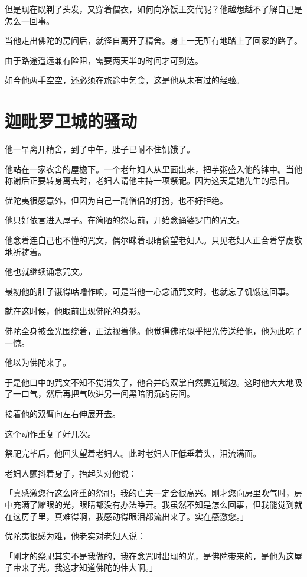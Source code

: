 \documentclass[twoside,openany]{book}
\begin{document}
但是现在既剃了头发，又穿着僧衣，如何向净饭王交代呢？他越想越不了解自己是怎么一回事。

当他走出佛陀的房间后，就径自离开了精舍。身上一无所有地踏上了回家的路子。

由于路途遥远兼有险阻，需要两天半的时间才可到达。

如今他两手空空，还必须在旅途中乞食，这是他从未有过的经验。

\section{迦毗罗卫城的骚动}\label{sec7.5}

他一早离开精舍，到了中午，肚子已耐不住饥饿了。

他站在一家农舍的屋檐下。一个老年妇人从里面出来，把芋粥盛入他的钵中。当他称谢后正要转身离去时，老妇人请他主持一项祭祀。因为这天是她先生的忌日。

优陀夷很感意外，但因为自己一副僧侣的打扮，也不好拒绝。

他只好依言进入屋子。在简陋的祭坛前，开始念诵婆罗门的咒文。

他念着连自己也不懂的咒文，偶尔眯着眼睛偷望老妇人。只见老妇人正合着掌虔敬地祈祷着。

他也就继续诵念咒文。

最初他的肚子饿得咕噜作响，可是当他一心念诵咒文时，也就忘了饥饿这回事。

就在这时候，他眼前出现佛陀的身影。

佛陀全身被金光围绕着，正法视着他。他觉得佛陀似乎把光传送给他，他为此吃了一惊。

他以为佛陀来了。

于是他口中的咒文不知不觉消失了，他合并的双掌自然靠近嘴边。这时他大大地吸了一口气，然后再把气吹进另一间黑暗阴沉的房间。

接着他的双臂向左右伸展开去。

这个动作重复了好几次。

祭祀完毕后，他回头望着老妇人。此时老妇人正低垂着头，泪流满面。

老妇人颤抖着身子，抬起头对他说：

「真感激您行这么隆重的祭祀，我的亡夫一定会很高兴。刚才您向房里吹气时，房中充满了耀眼的光，眼睛都没有办法睁开。我虽然不知是怎么回事，但我能觉到就在这房子里，真难得啊，我感动得眼泪都流出来了。实在感激您。」

优陀夷很感为难，他老实对老妇人说：

「刚才的祭祀其实不是我做的，我在念咒时出现的光，是佛陀带来的，是他为这屋子带来了光。我这才知道佛陀的伟大啊。」
\end{document}
